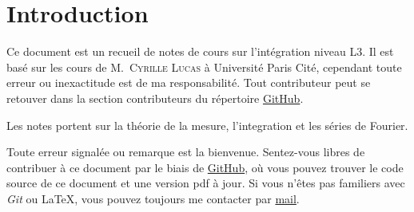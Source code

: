 \section{Introduction}

Ce document est un recueil de notes de cours sur l'intégration niveau L3. Il est
basé sur les cours de M.~\textsc{Cyrille Lucas} à Université Paris Cité, cependant toute
erreur ou inexactitude est de ma responsabilité. Tout contributeur
peut se retouver dans la section contributeurs du répertoire
\href{https://github.com/Yag000/integration-notes/graphs/contributors}{GitHub}.
\vspace{0.5cm}

Les notes portent sur la théorie de la mesure, l'integration et les séries de Fourier.
\vspace{0.5cm}

Toute erreur signalée ou remarque est la bienvenue.
Sentez-vous libres de contribuer à ce document par le biais de \href{https://github.com/Yag000/integration-notes}{GitHub},
où vous pouvez trouver le code source de ce document et une version pdf à jour.
Si vous n'êtes pas familiers avec \textit{Git} ou \LaTeX, vous pouvez toujours me contacter
par \href{mailto: yago.iglesias.vazquez@gmail.com}{mail}.









